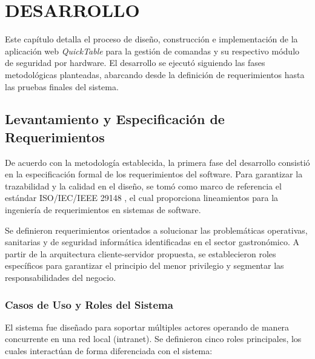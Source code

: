 \chapter{DESARROLLO}

Este capítulo detalla el proceso de diseño, construcción e implementación de la aplicación web \textit{QuickTable} para la gestión de comandas y su respectivo módulo de seguridad por hardware. El desarrollo se ejecutó siguiendo las fases metodológicas planteadas, abarcando desde la definición de requerimientos hasta las pruebas finales del sistema.

\section{Levantamiento y Especificación de Requerimientos}

De acuerdo con la metodología establecida, la primera fase del desarrollo consistió en la especificación formal de los requerimientos del software. Para garantizar la trazabilidad y la calidad en el diseño, se tomó como marco de referencia el estándar ISO/IEC/IEEE 29148 \cite{ISO29148:2018}, el cual proporciona lineamientos para la ingeniería de requerimientos en sistemas de software.

Se definieron requerimientos orientados a solucionar las problemáticas operativas, sanitarias y de seguridad informática identificadas en el sector gastronómico. A partir de la arquitectura cliente-servidor propuesta, se establecieron roles específicos para garantizar el principio del menor privilegio y segmentar las responsabilidades del negocio.


\subsection{Casos de Uso y Roles del Sistema}

El sistema fue diseñado para soportar múltiples actores operando de manera concurrente en una red local (intranet). Se definieron cinco roles principales, los cuales interactúan de forma diferenciada con el sistema:

